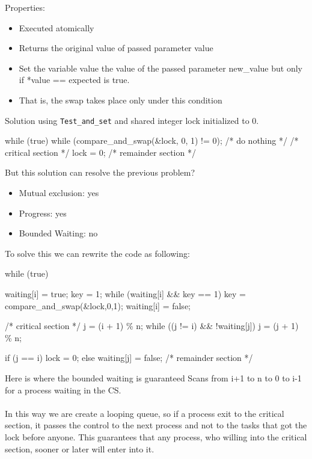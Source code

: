 Properties:

\begin{itemize}
    \item Executed atomically
    \item Returns the original value of passed parameter value
    \item Set the variable value the value of the passed parameter new\_value but only if *value == expected is true.
    \item That is, the swap takes place only under this condition
\end{itemize}

Solution using \verb|Test_and_set| and shared integer lock initialized to 0.
\begin{codeInC}
while (true){
    while (compare_and_swap(\&lock, 0, 1) != 0); /* do nothing */
    /* critical section */
    lock = 0;
    /* remainder section */
}

\end{codeInC}

But this solution can resolve the previous problem?

\begin{itemize}
\centering
    \item[] Mutual exclusion: yes
    \item[] Progress: yes
    \item[] Bounded Waiting: no
\end{itemize}

To solve this we can rewrite the code as following:


\begin{codeInC}
while (true) {
    waiting[i] = true;
    key = 1;
    while (waiting[i] && key == 1)
        key = compare_and_swap(&lock,0,1);
    waiting[i] = false;
    
    /* critical section */
    j = (i + 1) \% n;
    while ((j != i) && !waiting[j])
        j = (j + 1) \% n;
        
    if (j == i)
        lock = 0;
    else
        waiting[j] = false;
    /* remainder section */
}

\end{codeInC}

Here is where the bounded
waiting is guaranteed
Scans from i+1 to n to 0 to
i-1 for a process waiting in
the CS.

\paragraph{}
In this way we are create a looping queue, so if a process exit to the critical section, it passes the control to the next process and not to the tasks that got the lock before anyone. This guarantees that any process, who willing into the critical section, sooner or later will enter into it.



